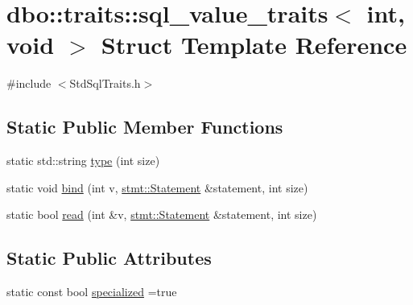 \hypertarget{structdbo_1_1traits_1_1sql__value__traits_3_01int_00_01void_01_4}{\section{dbo\+:\+:traits\+:\+:sql\+\_\+value\+\_\+traits$<$ int, void $>$ Struct Template Reference}
\label{structdbo_1_1traits_1_1sql__value__traits_3_01int_00_01void_01_4}
}


{\ttfamily \#include $<$Std\+Sql\+Traits.\+h$>$}

\subsection*{Static Public Member Functions}
\begin{DoxyCompactItemize}
\item 
static std\+::string \hyperlink{structdbo_1_1traits_1_1sql__value__traits_3_01int_00_01void_01_4_ac31d760d1acdf026409e92111e061e82}{type} (int size)
\item 
static void \hyperlink{structdbo_1_1traits_1_1sql__value__traits_3_01int_00_01void_01_4_aec351dcb72702b01ac0b1ceead67b519}{bind} (int v, \hyperlink{classdbo_1_1stmt_1_1_statement}{stmt\+::\+Statement} \&statement, int size)
\item 
static bool \hyperlink{structdbo_1_1traits_1_1sql__value__traits_3_01int_00_01void_01_4_a300457ce6a904ba6f17cffe6f71c78be}{read} (int \&v, \hyperlink{classdbo_1_1stmt_1_1_statement}{stmt\+::\+Statement} \&statement, int size)
\end{DoxyCompactItemize}
\subsection*{Static Public Attributes}
\begin{DoxyCompactItemize}
\item 
static const bool \hyperlink{structdbo_1_1traits_1_1sql__value__traits_3_01int_00_01void_01_4_a1b5a328dcfb4c559cb023133c073c090}{specialized} =true
\end{DoxyCompactItemize}


